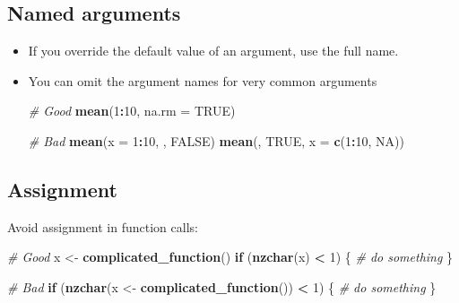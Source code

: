 \documentclass[
]{book}
\newenvironment{Shaded}{\begin{snugshade}}{\end{snugshade}}
\newcommand{\CommentTok}[1]{\textcolor[rgb]{0.56,0.35,0.01}{\textit{#1}}}
\newcommand{\ControlFlowTok}[1]{\textcolor[rgb]{0.13,0.29,0.53}{\textbf{#1}}}
\newcommand{\DataTypeTok}[1]{\textcolor[rgb]{0.13,0.29,0.53}{#1}}
\newcommand{\DecValTok}[1]{\textcolor[rgb]{0.00,0.00,0.81}{#1}}
\newcommand{\KeywordTok}[1]{\textcolor[rgb]{0.13,0.29,0.53}{\textbf{#1}}}
\newcommand{\NormalTok}[1]{#1}
\newcommand{\OperatorTok}[1]{\textcolor[rgb]{0.81,0.36,0.00}{\textbf{#1}}}
\newcommand{\OtherTok}[1]{\textcolor[rgb]{0.56,0.35,0.01}{#1}}
\newcommand{\StringTok}[1]{\textcolor[rgb]{0.31,0.60,0.02}{#1}}
\begin{document}
\hypertarget{named-arguments}{%
\subsection{Named arguments}\label{named-arguments}}

\begin{itemize}
\item
  If you override the default value of an argument, use the full name.
\item
  You can omit the argument names for very common arguments

\begin{Shaded}
\begin{Highlighting}[]
\CommentTok{# Good}
\KeywordTok{mean}\NormalTok{(}\DecValTok{1}\OperatorTok{:}\DecValTok{10}\NormalTok{, }\DataTypeTok{na.rm =} \OtherTok{TRUE}\NormalTok{)}

\CommentTok{# Bad}
\KeywordTok{mean}\NormalTok{(}\DataTypeTok{x =} \DecValTok{1}\OperatorTok{:}\DecValTok{10}\NormalTok{, , }\OtherTok{FALSE}\NormalTok{)}
\KeywordTok{mean}\NormalTok{(, }\OtherTok{TRUE}\NormalTok{, }\DataTypeTok{x =} \KeywordTok{c}\NormalTok{(}\DecValTok{1}\OperatorTok{:}\DecValTok{10}\NormalTok{, }\OtherTok{NA}\NormalTok{))}
\end{Highlighting}
\end{Shaded}
\end{itemize}

\hypertarget{assignment}{%
\subsection{Assignment}\label{assignment}}

Avoid assignment in function calls:

\begin{Shaded}
\begin{Highlighting}[]
\CommentTok{# Good}
\NormalTok{x <-}\StringTok{ }\KeywordTok{complicated_function}\NormalTok{()}
\ControlFlowTok{if}\NormalTok{ (}\KeywordTok{nzchar}\NormalTok{(x) }\OperatorTok{<}\StringTok{ }\DecValTok{1}\NormalTok{) \{}
  \CommentTok{# do something}
\NormalTok{\}}

\CommentTok{# Bad}
\ControlFlowTok{if}\NormalTok{ (}\KeywordTok{nzchar}\NormalTok{(x <-}\StringTok{ }\KeywordTok{complicated_function}\NormalTok{()) }\OperatorTok{<}\StringTok{ }\DecValTok{1}\NormalTok{) \{}
  \CommentTok{# do something}
\NormalTok{\}}
\end{Highlighting}
\end{Shaded}
\end{document}
